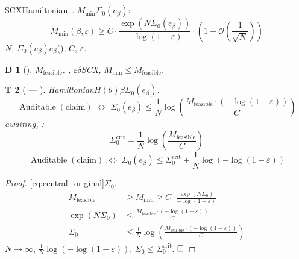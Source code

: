 \documentclass[12pt,a4paper]{article}
\newtheorem{theorem}Theorem[section]
\newtheorem{definition}[theorem]Definition
\theoremstyle{remark}
\DeclareMathOperator{\Auditable}{Auditable}
\begin{document}
\subsection{}
SCXHamiltonian~\cite{scx_hamiltonian}.
$M_{\min}$$\Sigma_0(e_\beta)$: 
\begin{equation}\label{eq:central_original}
    M_{\min}(\beta, \varepsilon) \geq C \cdot \frac{\exp(N \Sigma_0(e_\beta))}{-\log(1 - \varepsilon)} \cdot \left(1 + \mathcal{O}\left(\frac{1}{\sqrt{N}}\right)\right)
\end{equation}
$N$, $\Sigma_0(e_\beta)$$e_\beta$(), 
$C$, $\varepsilon$.
\textbf{}.
\begin{definition}[]
$M_{\text{feasible}}$.
\textbf{}, $\varepsilon$$\delta$SCX, 
$M_{\min} \leq M_{\text{feasible}}$.
\end{definition}
\begin{theorem}[ --- ]\label{thm:audit_condition_1}
Hamiltonian$H(\theta)$$\beta$$\Sigma_0(e_\beta)$.
\begin{equation}\label{eq:audit_condition}
    \boxed{\Auditable(\text{claim}) \;\Longleftrightarrow\; \Sigma_0(e_\beta) \leq \frac{1}{N} \log\left(\frac{M_{\text{feasible}} \cdot (-\log(1-\varepsilon))}{C}\right)}
\end{equation}
awaiting, \textbf{}: 
\begin{equation}\label{eq:threshold}
    \Sigma_0^{\text{crit}} = \frac{1}{N} \log\left(\frac{M_{\text{feasible}}}{C}\right)
\end{equation}
\begin{equation}\label{eq:audit_simple}
    \boxed{\Auditable(\text{claim}) \;\Longleftrightarrow\; \Sigma_0(e_\beta) \leq \Sigma_0^{\text{crit}} + \frac{1}{N}\log(-\log(1-\varepsilon))}
\end{equation}
\end{theorem}
\begin{proof}
\eqref{eq:central_original}$\Sigma_0$.
\begin{align}
    M_{\text{feasible}} &\geq M_{\min} \geq C \cdot \frac{\exp(N \Sigma_0)}{-\log(1-\varepsilon)} \\
    \exp(N \Sigma_0) &\leq \frac{M_{\text{feasible}} \cdot (-\log(1-\varepsilon))}{C} \\
    \Sigma_0 &\leq \frac{1}{N} \log\left(\frac{M_{\text{feasible}} \cdot (-\log(1-\varepsilon))}{C}\right)
\end{align}
$N \to \infty$, $\frac{1}{N}\log(-\log(1-\varepsilon))$, 
$\Sigma_0 \leq \Sigma_0^{\text{crit}}$.
$\hfill \square$
\end{proof}
\end{document}
